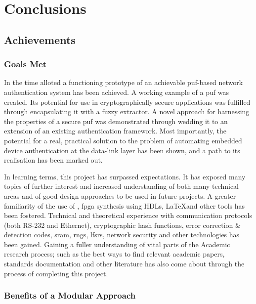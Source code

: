 
\chapter{Conclusions} %
\label{ch:conclusion} %


\section{Achievements}

\subsection{Goals Met}

In the time alloted a functioning prototype of an achievable \gls{puf}-based
network authentication system has been achieved. A working example of a
\gls{puf} was created. Its potential for use in cryptographically secure
applications was fulfilled through encapsulating it with a fuzzy extractor.
A novel approach for harnessing the properties of a secure \gls{puf} was
demonstrated through wedding it to an extension of an existing authentication
framework. Most importantly, the potential for a real, practical solution to the problem of
automating embedded device authentication at the data-link layer has been shown,
and a path to its realisation has been marked out.

In learning terms, this project has surpassed expectations. It has exposed many
topics of further interest and increased understanding of both many technical areas
and of good design approaches to be used in future projects. A greater
familiarity of the use of \matlab, \gls{fpga} synthesis using HDLs, \LaTeX and other tools
has been fostered. Technical and theoretical experience with communication
protocols (both RS-232 and Ethernet), cryptographic hash functions,
error correction \& detection codes, \gls{sram}, \glspl{rng}, \glspl{lfsr}, network security
and other technologies has been gained. Gaining a fuller understanding of vital parts
of the Academic research process; such as the best ways to find relevant academic
papers, standards documentation and other literature has also come about through
the process of completing this project.

\subsection{Benefits of a Modular Approach}

